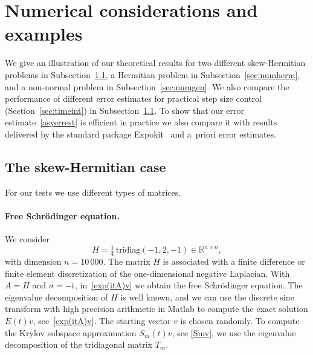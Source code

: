 \documentclass[smallextended]{svjour3pre}%
\numberwithin{equation}{section}
\numberwithin{figure}{section}
\numberwithin{table}{section}
\newcommand{\R}{\mathbb R}
\newcommand\tjnew[1]{{#1}}
\newcommand{\ii}{{\rm i}}
\newcommand\sca{\sigma}
\begin{document}



\section{Numerical considerations and examples}\label{sec:num}
\tjnew{
We give an illustration of our theoretical results
for two different skew-Hermitian problems in Subsection~\ref{sec:skew-herm},
a Hermitian problem in Subsection~\ref{sec:numherm}, 
and a non-normal problem in Subsection~\ref{sec:numgen}.
We also compare the performance of different error estimates
for practical step size control (Section~\ref{sec:timeint}) in Subsection~\ref{sec:skew-herm}.
To show that our error estimate~\eqref{asyerrest}
is efficient in practice we also compare
it with results delivered by the standard package Expokit~\cite{sidje98}
and a~priori error estimates.}


\subsection{The skew-Hermitian case}\label{sec:skew-herm}
\tjnew{
For our tests we use different types of matrices.}
\paragraph{Free Schr{\"o}dinger equation.}
We consider
\begin{equation} \label{Hschroe}
H=\tfrac{1}{4}\, \text{tridiag}(-1,2,-1) \in\R^{n\times n},
\end{equation}
with dimension $n=10\,000$.
The matrix $H$ is \tjnew{associated with a
finite difference or finite element discretization of the one-dimensional negative Laplacian}.
With $A=H$ and $\sca=-\ii$, in~\eqref{exp(itA)v} we obtain the free Schr{\"o}dinger equation.
The eigenvalue decomposition of $H$ is well known,
and we can use the discrete sine transform with high precision arithmetic in Matlab to compute the exact solution $E(t)v$, see~\eqref{exp(itA)v}. The starting vector $v$ is chosen randomly. To compute the Krylov subspace approximation $S_m(t)v$, see \eqref{Smv},
we use the eigenvalue decomposition of the tridiagonal matrix $T_m$.
\end{document}
